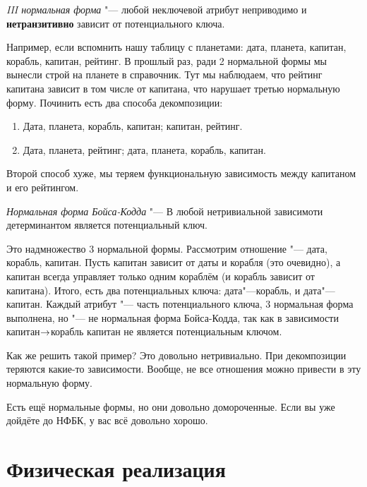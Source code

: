 \begin{Def}
	\textit{III нормальная форма} "--- любой неключевой атрибут неприводимо и \textbf{нетранзитивно} зависит от потенциального ключа.
\end{Def}
Например, если вспомнить нашу таблицу с планетами: дата, планета, капитан, корабль, капитан, рейтинг.
В прошлый раз, ради 2 нормальной формы мы вынесли строй на планете в справочник.
Тут мы наблюдаем, что рейтинг капитана зависит в том числе от капитана, что нарушает третью нормальную форму.
Починить есть два способа декомпозиции:
\begin{enumerate}
	\item Дата, планета, корабль, капитан; капитан, рейтинг.
	\item Дата, планета, рейтинг; дата, планета, корабль, капитан.
\end{enumerate}
Второй способ хуже, мы теряем функциональную зависимость между капитаном и его рейтингом.

\begin{Def}
	\textit{Нормальная форма Бойса-Кодда} "--- В любой нетривиальной зависимоти детерминантом является потенциальный ключ.
\end{Def}
Это надмножество 3 нормальной формы.
Рассмотрим отношение "--- дата, корабль, капитан.
Пусть капитан зависит от даты и корабля (это очевидно), а капитан всегда управляет только одним кораблём (и корабль зависит от капитана).
Итого, есть два потенциальных ключа: дата"---корабль, и дата"---капитан.
Каждый атрибут "--- часть потенциального ключа, 3 нормальная форма выполнена, но "--- не нормальная форма Бойса-Кодда,
так как в зависимости капитан$\rightarrow$корабль капитан не является потенциальным ключом.

Как же решить такой пример?
Это довольно нетривиально.
При декомпозиции теряются какие-то зависимости.
Вообще, не все отношения можно привести в эту нормальную форму.

Есть ещё нормальные формы, но они довольно домороченные.
Если вы уже дойдёте до НФБК, у вас всё довольно хорошо.

\chapter{Физическая реализация}

